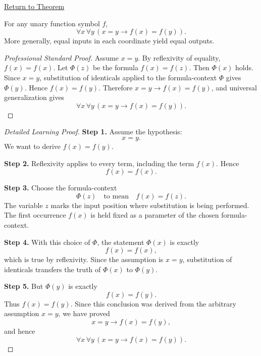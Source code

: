 \newpage
{}
\label{prf:axiomatic-equality-function-congruence}

\begin{remark*}[Return]
\hyperref[thm:axiomatic-equality-function-congruence]{Return to Theorem}
\end{remark*}


\begin{theorem*}
For any unary function symbol \(f\),
\[
  \forall x\,\forall y\,(x=y\to f(x)=f(y)).
\]
More generally, equal inputs in each coordinate yield equal outputs.
\end{theorem*}

\begin{proof}[Professional Standard Proof]
\LRAProofBodyStart
Assume \(x=y\). By reflexivity of equality, \(f(x)=f(x)\). Let \(\Phi(z)\)
be the formula \(f(x)=f(z)\). Then \(\Phi(x)\) holds. Since \(x=y\),
substitution of identicals applied to the formula-context \(\Phi\) gives
\(\Phi(y)\). Hence \(f(x)=f(y)\). Therefore \(x=y\to f(x)=f(y)\), and
universal generalization gives
\[
  \forall x\,\forall y\,(x=y\to f(x)=f(y)).
\]
\end{proof}

\begin{proof}[Detailed Learning Proof]
\LRAProofBodyStart
\textbf{Step 1.} Assume the hypothesis:
\[
  x=y.
\]
We want to derive \(f(x)=f(y)\).

\textbf{Step 2.} Reflexivity applies to every term, including the term
\(f(x)\). Hence
\[
  f(x)=f(x).
\]

\textbf{Step 3.} Choose the formula-context
\[
  \Phi(z) \quad\text{to mean}\quad f(x)=f(z).
\]
The variable \(z\) marks the input position where substitution is being
performed. The first occurrence \(f(x)\) is held fixed as a parameter of the
chosen formula-context.

\textbf{Step 4.} With this choice of \(\Phi\), the statement \(\Phi(x)\) is
exactly
\[
  f(x)=f(x),
\]
which is true by reflexivity. Since the assumption is \(x=y\), substitution of
identicals transfers the truth of \(\Phi(x)\) to \(\Phi(y)\).

\textbf{Step 5.} But \(\Phi(y)\) is exactly
\[
  f(x)=f(y).
\]
Thus \(f(x)=f(y)\). Since this conclusion was derived from the arbitrary
assumption \(x=y\), we have proved
\[
  x=y\to f(x)=f(y),
\]
and hence
\[
  \forall x\,\forall y\,(x=y\to f(x)=f(y)).
\]
\end{proof}

